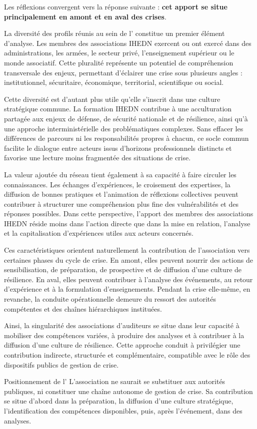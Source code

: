 Les réflexions convergent vers la réponse suivante : \textbf{cet apport se situe principalement en amont et en aval des crises}.

La diversité des profils réunis au sein de l'\ARSeize{} constitue un premier élément d'analyse. Les membres des associations IHEDN exercent ou ont exercé dans des administrations, les armées, le secteur privé, l'enseignement supérieur ou le monde associatif. Cette pluralité représente un potentiel de compréhension transversale des enjeux, permettant d'éclairer une crise sous plusieurs angles : institutionnel, sécuritaire, économique, territorial, scientifique ou social.

Cette diversité est d'autant plus utile qu'elle s'inscrit dans une culture stratégique commune. La formation IHEDN contribue à une acculturation partagée aux enjeux de défense, de sécurité nationale et de résilience, ainsi qu'à une approche interministérielle des problématiques complexes. Sans effacer les différences de parcours ni les responsabilités propres à chacun, ce socle commun facilite le dialogue entre acteurs issus d'horizons professionnels distincts et favorise une lecture moins fragmentée des situations de crise.

La valeur ajoutée du réseau tient également à sa capacité à faire circuler les connaissances. Les échanges d'expériences, le croisement des expertises, la diffusion de bonnes pratiques et l'animation de réflexions collectives peuvent contribuer à structurer une compréhension plus fine des vulnérabilités et des réponses possibles. Dans cette perspective, l'apport des membres des associations IHEDN réside moins dans l'action directe que dans la mise en relation, l'analyse et la capitalisation d'expériences utiles aux acteurs concernés.

Ces caractéristiques orientent naturellement la contribution de l'association vers certaines phases du cycle de crise. En amont, elles peuvent nourrir des actions de sensibilisation, de préparation, de prospective et de diffusion d'une culture de résilience. En aval, elles peuvent contribuer à l'analyse des événements, au retour d'expérience et à la formulation d'enseignements. Pendant la crise elle-même, en revanche, la conduite opérationnelle demeure du ressort des autorités compétentes et des chaînes hiérarchiques instituées.

Ainsi, la singularité des associations d'auditeurs se situe dans leur capacité à mobiliser des compétences variées, à produire des analyses et à contribuer à la diffusion d'une culture de résilience. Cette approche conduit à privilégier une contribution indirecte, structurée et complémentaire, compatible avec le rôle des dispositifs publics de gestion de crise.

\begin{proposition}{Positionnement de l'\ARSeize}
L'association ne saurait se substituer aux autorités publiques, ni constituer une chaîne autonome de gestion de crise. Sa contribution se situe d'abord dans la préparation, la diffusion d'une culture stratégique, l'identification des compétences disponibles, puis, après l'événement, dans des analyses.
\end{proposition}
